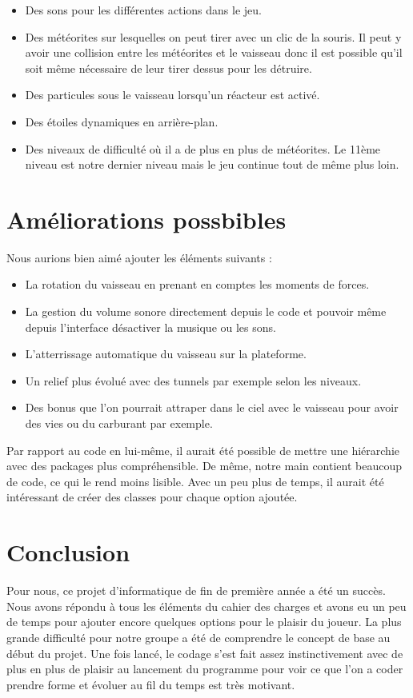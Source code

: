 \begin{itemize}
 \item	Des sons pour les différentes actions dans le jeu.
 \item	Des météorites sur lesquelles on peut tirer avec un clic de la souris. Il peut y avoir une collision entre les météorites et le vaisseau donc il est possible qu’il soit même nécessaire de leur tirer dessus pour les détruire.
 \item	Des particules sous le vaisseau lorsqu’un réacteur est activé.
 \item	Des étoiles dynamiques en arrière-plan.
 \item	Des niveaux de difficulté où il a de plus en plus de météorites. Le 11ème niveau est notre dernier niveau mais le jeu continue tout de même plus loin.
\end{itemize}

\section{Améliorations possbibles}
Nous aurions bien aimé ajouter les éléments suivants :
\begin{itemize}
 \item La rotation du vaisseau en prenant en comptes les moments de forces.
 \item La gestion du volume sonore directement depuis le code et pouvoir même depuis l’interface désactiver la musique ou les sons.
 \item L’atterrissage automatique du vaisseau sur la plateforme.
 \item Un relief plus évolué avec des tunnels par exemple selon les niveaux.
 \item Des bonus que l’on pourrait attraper dans le ciel avec le vaisseau pour avoir des vies ou du carburant par exemple.
\end{itemize}

Par rapport au code en lui-même, il aurait été possible de mettre une hiérarchie avec des packages plus compréhensible.
De même, notre main contient beaucoup de code, ce qui le rend moins lisible. Avec un peu plus de temps, il aurait été intéressant de créer des classes pour chaque option ajoutée.


\section{Conclusion}
Pour nous, ce projet d’informatique de fin de première année a été un succès. Nous avons répondu à tous les éléments du cahier des charges et avons eu un peu de temps pour ajouter encore quelques options pour le plaisir du joueur. La plus grande difficulté pour notre groupe a été de comprendre le concept de base au début du projet. Une fois lancé, le codage s’est fait assez instinctivement avec de plus en plus de plaisir au lancement du programme pour voir ce que l’on a coder prendre forme et évoluer au fil du temps est très motivant.

